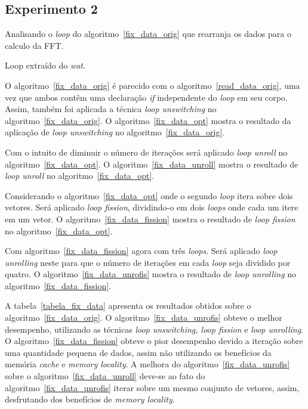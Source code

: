 \newpage
\subsection{Experimento 2}

Analisando o \textit{loop} do algoritmo~\ref{fix_data_orig} que rearranja os dados
para o calculo da FFT. 

\begin{algorithm}[H]
  \caption{Loop extraído do \textit{wat}.}
    \label{fix_data_orig}

\end{algorithm}

O algoritmo~\ref{fix_data_orig} é parecido com o algoritmo~\ref{read_data_orig}, uma
vez que ambos contêm uma declaração \textit{if} independente do \textit{loop} em seu corpo. 
Assim, também foi aplicada a técnica \textit{loop unswitching} no
algoritmo~\ref{fix_data_orig}.
O algoritmo~\ref{fix_data_opt} mostra o resultado da aplicação de \textit{loop
unswitching} no algoritmo~\ref{fix_data_orig}.

Com o intuito de diminuir o número de iterações será aplicado \textit{loop
unroll} no algoritmo~\ref{fix_data_opt}. 
O algoritmo~\ref{fix_data_unroll} mostra o resultado de \textit{loop unroll} no
algoritmo~\ref{fix_data_opt}.

Considerando o algoritmo~\ref{fix_data_opt} onde o segundo \textit{loop} itera
sobre dois vetores. Será aplicado \textit{loop fission}, dividindo-o em dois 
\textit{loops} onde cada um itere em um vetor.
O algoritmo~\ref{fix_data_fission} mostra o resultado de \textit{loop fission}
no algoritmo~\ref{fix_data_opt}.

Com algoritmo~\ref{fix_data_fission} agora com três \textit{loops}. Será
aplicado \textit{loop unrolling} neste para que o número de iterações em cada
\textit{loop} seja dividido por quatro. 
O algoritmo~\ref{fix_data_unrofis} mostra o resultado de \textit{loop unrolling}
no algoritmo~\ref{fix_data_fission}.

A tabela~\ref{tabela_fix_data} apresenta os resultados obtidos sobre o
algoritmo~\ref{fix_data_orig}.
O algoritmo~\ref{fix_data_unrofis} obteve o melhor desempenho, utilizando as
técnicas \textit{loop unswitching, loop fission} e \textit{loop unrolling}.
O algoritmo~\ref{fix_data_fission} obteve o pior desempenho devido a iteração
sobre uma quantidade pequena de dados, assim não utilizando os benefícios da 
memória \textit{cache} e \textit{memory locality}.
A melhora do algoritmo~\ref{fix_data_unrofis} sobre o
algoritmo~\ref{fix_data_unroll} deve-se ao fato do
algoritmo~\ref{fix_data_unrofis} iterar sobre um mesmo conjunto de vetores,
assim, desfrutando dos benefícios de \textit{memory locality}.

